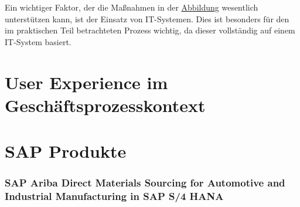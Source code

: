 Ein wichtiger Faktor, der die Ma\ss nahmen in der \hyperref[fig:Geschäftsprozessoptimierung_Massnahmen]{Abbildung} wesentlich unterstützen kann, ist der Einsatz von IT-Systemen. Dies ist besonders für den im praktischen Teil betrachteten Prozess wichtig, da dieser vollständig auf einem IT-System basiert.

\section{User Experience im Geschäftsprozesskontext}




\section{SAP Produkte}

\subsubsection{SAP Ariba Direct Materials Sourcing for Automotive and Industrial Manufacturing in SAP S/4 HANA}

